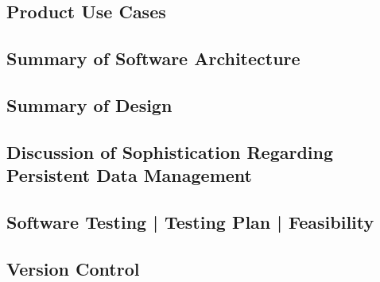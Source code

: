 \documentclass[12pt, a4]{report}
\begin{document}
\subsection{Product Use Cases}
\par 

\subsection{Summary of Software Architecture}
\par 

\subsection{Summary of Design}
\par 

\subsection{Discussion of Sophistication Regarding Persistent Data Management}
\par 

\subsection{Software Testing | Testing Plan | Feasibility}
\par 

\subsection{Version Control}



	
	
	

\end{document}
